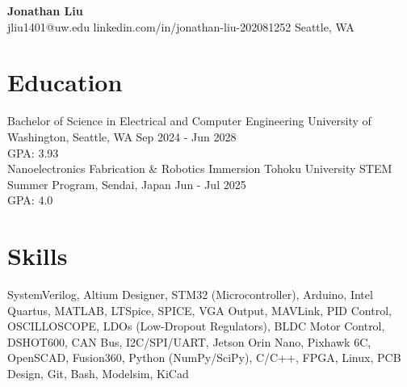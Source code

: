 \documentclass[11pt,letterpaper]{article}
\begin{document}
\begin{center}
{\LARGE \textbf{Jonathan Liu}}\\[2pt]
\small jliu1401@uw.edu \textbullet{} linkedin.com/in/jonathan-liu-202081252 \textbullet{} Seattle, WA
\end{center}
\section*{Education}
\noindent Bachelor of Science in Electrical and Computer Engineering \textbar{} University of Washington, Seattle, WA \textbar{} Sep 2024 - Jun 2028\\
GPA: 3.93\\
\noindent Nanoelectronics Fabrication \& Robotics Immersion \textbar{} Tohoku University STEM Summer Program, Sendai, Japan \textbar{} Jun - Jul 2025\\
GPA: 4.0\\
\section*{Skills}
SystemVerilog, Altium Designer, STM32 (Microcontroller), Arduino, Intel Quartus, MATLAB, LTSpice, SPICE, VGA Output, MAVLink, PID Control, OSCILLOSCOPE, LDOs (Low-Dropout Regulators), BLDC Motor Control, DSHOT600, CAN Bus, I2C/SPI/UART, Jetson Orin Nano, Pixhawk 6C, OpenSCAD, Fusion360, Python (NumPy/SciPy), C/C++, FPGA, Linux, PCB Design, Git, Bash, Modelsim, KiCad
\end{document}
